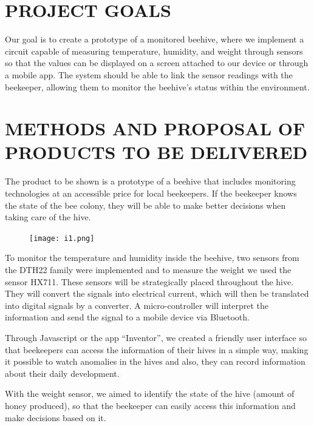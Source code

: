 \documentclass[12pt]{report}
\begin{document}
	\chapter{PROJECT GOALS}
	Our goal is to create a prototype of a monitored beehive, where we implement a circuit capable of measuring temperature, humidity, and weight through sensors so that the values can be displayed on a screen attached to our device or through a mobile app. The system should be able to link the sensor readings with the beekeeper, allowing them to monitor the beehive's status within the environment.
	
	
	\chapter{METHODS AND PROPOSAL OF PRODUCTS TO BE DELIVERED}
	The product to be shown is a prototype of a beehive that includes monitoring technologies at an accessible price for local beekeepers. If the beekeeper knows the state of the bee colony, they will be able to make better decisions when taking care of the hive.
	\begin{center}
		\begin{figure}[h!]
			\texttt{[image: i1.png]}
		\end{figure}
	\end{center}
	To monitor the temperature and humidity inside the beehive, two sensors from the DTH22 family were implemented and to measure the weight we used the sensor HX711. These sensors will be strategically placed throughout the hive. They will convert the signals into electrical current, which will then be translated into digital signals by a converter. A micro-controller will interpret the information and send the signal to a mobile device via Bluetooth.
	
	\par Through Javascript or the app ``Inventor'', we created a friendly user interface so that beekeepers can access the information of their hives in a simple way, making it possible to watch anomalies in the hives and also, they can record information about their daily development.
	
	\par With the weight sensor, we aimed to identify the state of the hive (amount of honey produced), so that the beekeeper can easily access this information and make decisions based on it.
	
\end{document}
